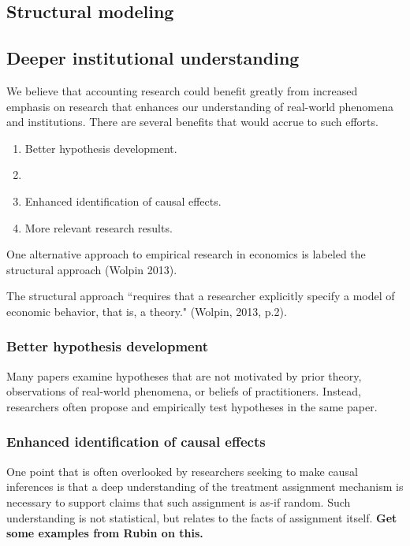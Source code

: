 \documentclass[11pt]{amsart}
\begin{document}
\subsection{Structural modeling}


\subsection{Deeper institutional understanding}

We believe that accounting research could benefit greatly from increased emphasis on research that enhances our understanding of real-world phenomena and institutions. There are several benefits that would accrue to such efforts.

\begin{enumerate}
\item Better hypothesis development.  
\item %
\item Enhanced identification of causal effects.
\item More relevant research results.
\end{enumerate}

One alternative approach to empirical research in economics is labeled the structural approach (Wolpin 2013).

The structural approach ``requires that a researcher explicitly specify a model of economic behavior, that is, a theory." (Wolpin, 2013, p.2).


\subsubsection{Better hypothesis development}
Many papers examine hypotheses that are not motivated by prior theory,  observations of real-world phenomena, or beliefs of practitioners. Instead, researchers often propose and empirically test hypotheses in the same paper.

\subsubsection{Enhanced identification of causal effects}
One point that is often overlooked by researchers seeking to make causal inferences is that a deep understanding of the treatment assignment mechanism is necessary to support claims that such assignment is as-if random. Such understanding is not statistical, but relates to the facts of assignment itself. \textbf{Get some examples from Rubin on this.}
\end{document}
